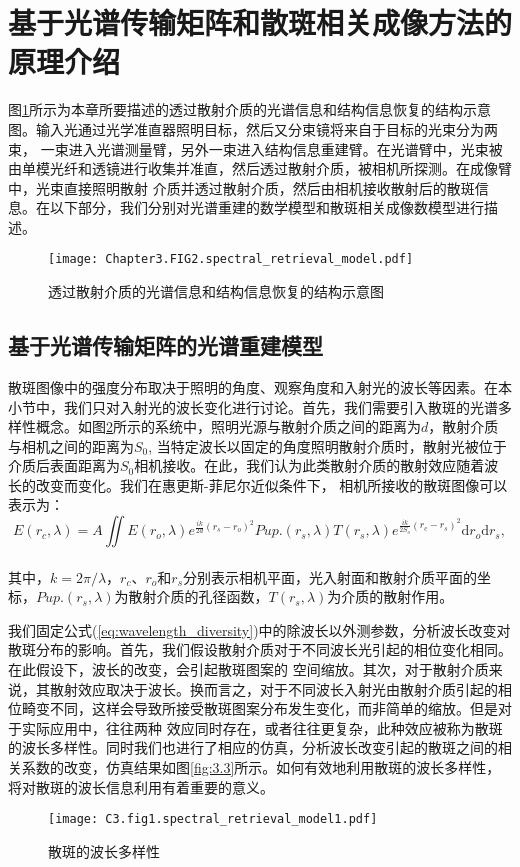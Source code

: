 \section{基于光谱传输矩阵和散斑相关成像方法的原理介绍}
图\ref{fig:3.1}所示为本章所要描述的透过散射介质的光谱信息和结构信息恢复的结构示意图。输入光通过光学准直器照明目标，然后又分束镜将来自于目标的光束分为两束，
一束进入光谱测量臂，另外一束进入结构信息重建臂。在光谱臂中，光束被由单模光纤和透镜进行收集并准直，然后透过散射介质，被相机所探测。在成像臂中，光束直接照明散射
介质并透过散射介质，然后由相机接收散射后的散斑信息。在以下部分，我们分别对光谱重建的数学模型和散斑相关成像数模型进行描述。
\begin{figure}[htp]
	\centering
	\texttt{[image: Chapter3.FIG2.spectral\_retrieval\_model.pdf]}
	\caption{透过散射介质的光谱信息和结构信息恢复的结构示意图}
	\label{fig:3.1}
\end{figure}

\subsection{基于光谱传输矩阵的光谱重建模型}
散斑图像中的强度分布取决于照明的角度、观察角度和入射光的波长等因素。在本小节中，我们只对入射光的波长变化进行讨论。首先，我们需要引入散斑的光谱多样性概念。如图\ref{fig:3.2}所示的系统中，照明光源与散射介质之间的距离为$d$，散射介质与相机之间的距离为$S_{0}$,
当特定波长以固定的角度照明散射介质时，散射光被位于介质后表面距离为$S_{0}$相机接收。在此，我们认为此类散射介质的散射效应随着波长的改变而变化。我们在惠更斯-菲尼尔近似条件下，
相机所接收的散斑图像可以表示为：
~\\
\begin{equation}
    E(r_{c},\lambda) = A\iint E(r_{o},\lambda)e^{\frac{ik}{2d}(r_{s}-r_{o})^{2}}Pup.(r_{s},\lambda)T(r_{s},\lambda)e^{\frac{ik}{2S_{o}}(r_{c}-r_{s})^{2}}\mathrm{d}{r_{o}}\mathrm{d}{r_{s}}
\label{eq:wavelength_diversity},
\end{equation}
~\\
其中，$k =2\pi/\lambda$，$r_{c}$、$r_{o}$和$r_{s}$分别表示相机平面，光入射面和散射介质平面的坐标，$Pup.(r_{s},\lambda)$为散射介质的孔径函数，$T(r_{s},\lambda)$为介质的散射作用。

我们固定公式(\ref{eq:wavelength_diversity})中的除波长以外测参数，分析波长改变对散斑分布的影响。首先，我们假设散射介质对于不同波长光引起的相位变化相同。在此假设下，波长的改变，会引起散斑图案的
空间缩放。其次，对于散射介质来说，其散射效应取决于波长。换而言之，对于不同波长入射光由散射介质引起的相位畸变不同，这样会导致所接受散斑图案分布发生变化，而非简单的缩放。但是对于实际应用中，往往两种
效应同时存在，或者往往更复杂，此种效应被称为散斑的波长多样性。同时我们也进行了相应的仿真，分析波长改变引起的散斑之间的相关系数的改变，仿真结果如图\ref{fig:3.3}所示。如何有效地利用散斑的波长多样性，将对散斑的波长信息利用有着重要的意义。
~\\
\begin{figure}[htp]
	\centering
	\texttt{[image: C3.fig1.spectral\_retrieval\_model1.pdf]}
	\caption{散斑的波长多样性}
	\label{fig:3.2}
\end{figure}
~\\

